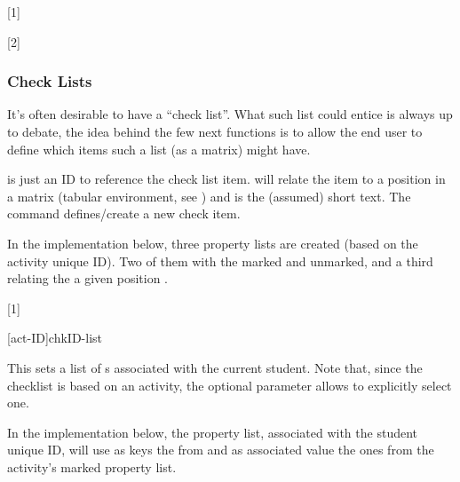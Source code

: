 \documentclass[10pt]{article}
\begin{document}
[1]



[2]



\subsubsection{Check Lists}\label{Activity-checklist}

It's often desirable to have a ``check list''. What such list could entice is always up to debate, the idea behind the few next functions is to allow the end user to define which items such a list (as a matrix) might have.

\begin{codedescribe}{\checkdef}
\begin{codesyntax}
\end{codesyntax}
   is just an ID to reference the check list item.  will relate the item to a position in a matrix (tabular environment, see \tsobj{\StudentCheckListTable}) and  is the (assumed) short text.
  The command \tsobj{\checkdef} defines/create a new check item.
\end{codedescribe}
\begin{tsremark}
  In the implementation below, three property lists are created (based on the activity unique ID). Two of them with the  marked and unmarked, and a third relating the  a given position .
\end{tsremark}



[1]

\begin{codedescribe}{\checklist}
\begin{codesyntax}
  \tsmacro{\checklist}[act-ID]{chkID-list}
\end{codesyntax}
  This sets a list of s associated with the current student. Note that, since the checklist is based on an activity, the optional parameter allows to explicitly select one.
\end{codedescribe}
\begin{tsremark}
  In the implementation below, the property list, associated with the student unique ID, will use as keys the  from \tsobj{\checkdef} and as associated value the ones from the activity's marked property list.
\end{tsremark}
\end{document}
